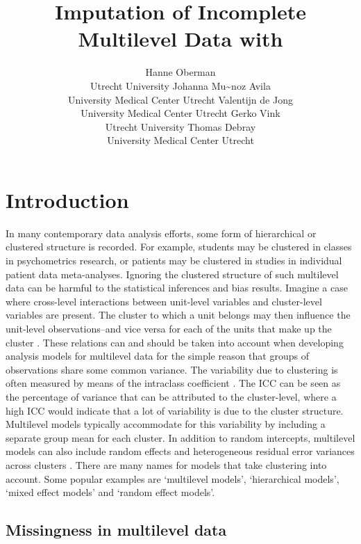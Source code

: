 \documentclass[
]{jss}
\author{
Hanne Oberman\\Utrecht University \And Johanna Mu\textasciitilde noz
Avila\\University Medical Center Utrecht \AND Valentijn de
Jong\\University Medical Center Utrecht \And Gerko Vink\\Utrecht
University \AND Thomas Debray\\University Medical Center Utrecht
}
\title{Imputation of Incomplete Multilevel Data with \pkg{mice}}
\begin{document}
\hypertarget{introduction}{%
\section{Introduction}\label{introduction}}

In many contemporary data analysis efforts, some form of hierarchical or
clustered structure is recorded. For example, students may be clustered
in classes in psychometrics research, or patients may be clustered in
studies in individual patient data meta-analyses. Ignoring the clustered
structure of such multilevel data can be harmful to the statistical
inferences and bias results. Imagine a case where cross-level
interactions between unit-level variables and cluster-level variables
are present. The cluster to which a unit belongs may then influence the
unit-level observations--and vice versa for each of the units that make
up the cluster \citep{hox17}. These relations can and should be taken
into account when developing analysis models for multilevel data for the
simple reason that groups of observations share some common variance.
The variability due to clustering is often measured by means of the
intraclass coefficient \citep[ICC,][]{fish25}. The ICC can be seen as
the percentage of variance that can be attributed to the cluster-level,
where a high ICC would indicate that a lot of variability is due to the
cluster structure. Multilevel models typically accommodate for this
variability by including a separate group mean for each cluster. In
addition to random intercepts, multilevel models can also include random
effects and heterogeneous residual error variances across clusters
\citep[see e.g.][\citet{hox17} and \citet{jong21}]{gelm06}. There are
many names for models that take clustering into account. Some popular
examples are `multilevel models', `hierarchical models', `mixed effect
models' and `random effect models'.

\hypertarget{missingness-in-multilevel-data}{%
\subsection{Missingness in multilevel
data}\label{missingness-in-multilevel-data}}
\end{document}
